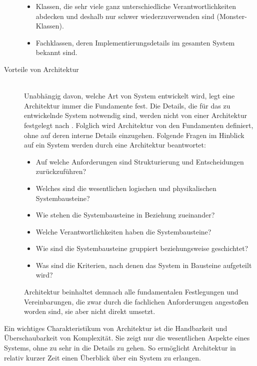 \begin{description}
\begin{itemize}
  \item Klassen, die sehr viele ganz unterschiedliche Verantwortlichkeiten abdecken und deshalb nur schwer wiederzuverwenden sind (\glqq Monster\grqq -Klassen).
  \item Fachklassen, deren Implementierungsdetails im gesamten System bekannt sind.
  \end{itemize}
\item[Vorteile von Architektur] \hfill \\
  Unabhängig davon, welche Art von System entwickelt wird, legt eine Architektur immer die Fundamente fest. Die Details, die für das zu entwickelnde System notwendig sind, werden nicht von einer Architektur festgelegt \citereset \autocite[siehe][]{Buschmann.1996} nach \citereset \autocite[siehe][S. 6-8]{Vogel.2009}. Folglich wird Architektur von den Fundamenten definiert, ohne auf deren interne Details einzugehen. Folgende Fragen im Hinblick auf ein System werden durch eine Architektur beantwortet:
  \begin{itemize}
  \item Auf welche Anforderungen sind Strukturierung und Entscheidungen zurückzuführen?
  \item Welches sind die wesentlichen logischen und physikalischen Systembausteine?
  \item Wie stehen die Systembausteine in Beziehung zueinander?
  \item Welche Verantwortlichkeiten haben die Systembausteine?
  \item Wie sind die Systembausteine gruppiert beziehungsweise geschichtet?
  \item Was sind die Kriterien, nach denen das System in Bausteine aufgeteilt wird?
  \end{itemize}
Architektur beinhaltet demnach alle fundamentalen Festlegungen und Vereinbarungen, die zwar durch die fachlichen Anforderungen angestoßen worden sind, sie aber nicht direkt umsetzt.
\end{description}

Ein wichtiges Charakteristikum von Architektur ist die Handbarkeit und Überschaubarkeit von Komplexität. Sie zeigt nur die wesentlichen Aspekte eines Systems, ohne zu sehr in die Details zu gehen. So ermöglicht Architektur in relativ kurzer Zeit einen Überblick über ein System zu erlangen.


